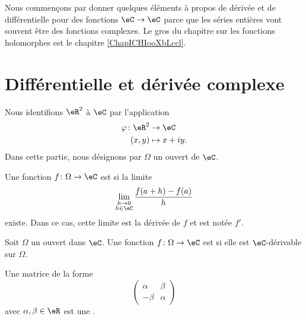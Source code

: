 
Nous commençons par donner quelques éléments à propos de dérivée et de différentielle pour des fonctions \( \eC\to \eC\) parce que les séries entières vont souvent être des fonctions complexes. Le gros du chapitre sur les fonctions holomorphes est le chapitre \ref{ChapICHIooXbLccl}.

\section{Différentielle et dérivée complexe}
\label{SECooJWNOooOgMiWR}

Nous identifions \( \eR^2\) à \( \eC\) par l'application
\begin{equation}
    \begin{aligned}
        \varphi\colon \eR^2&\to \eC \\
        (x,y)&\mapsto x+iy. 
    \end{aligned}
\end{equation}
Dans cette partie, nous désignons par \( \Omega\) un ouvert de \( \eC\). 

\begin{definition}      \label{DEFooVJVXooKlnFkh}
    Une fonction \( f\colon \Omega\to \eC\) est  si la limite
    \begin{equation}
        \lim_{\substack{h\to0\\h\in \eC}} \frac{ f(a+h)-f(a) }{ h }
    \end{equation}
    existe. Dans ce cas, cette limite est la dérivée de \( f\) et est notée \( f'\).
\end{definition}

\begin{definition}  \label{DefMMpjJZ}
    Soit \( \Omega\) un ouvert dans \( \eC\). Une fonction \( f\colon \Omega\to \eC\) est  si elle est \( \eC\)-dérivable sur \( \Omega\). 
\end{definition}

\begin{definition}
    Une matrice de la forme
    \begin{equation}
        \begin{pmatrix}
            \alpha    &   \beta    \\ 
            -\beta    &   \alpha    
        \end{pmatrix}
    \end{equation}
    avec \( \alpha,\beta\in \eR\) est une .
\end{definition}


